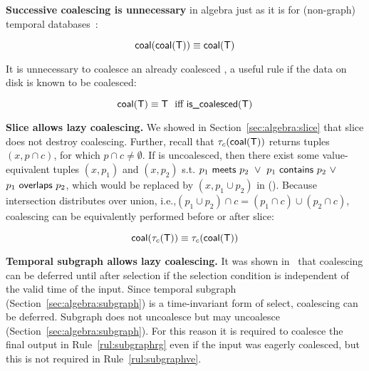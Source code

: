 {\bf Successive coalescing is unnecessary} in \tg algebra just as it
is for (non-graph) temporal
databases~\cite{DBLP:conf/vldb/BohlenSS96}:

\begin{equation}
\textsf{coal}(\textsf{coal}(\mathsf{T})) \equiv \textsf{coal}(\mathsf{T})
\label{rul:twice}
\end{equation}

It is unnecessary to coalesce an already coalesced \ttt, a useful rule
if the data on disk is known to be coalesced:

\begin{equation}
\textsf{coal}(\mathsf{T}) \equiv \mathsf{T} ~~\text{iff}~\textsf{is\_coalesced}(\mathsf{T})
\label{rul:cond}
\end{equation}



{\bf Slice allows lazy coalescing.}  We showed in
Section~\ref{sec:algebra:slice} that slice does not destroy
coalescing.  Further, recall that $\tau_c(\textsf{coal}(\mathsf{T}))$ returns tuples
$(x,p \cap c)$, for which $p \cap c \neq \emptyset$.  If \ttt is
uncoalesced, then there exist some value-equivalent tuples $(x, p_1)$
and $(x, p_2)$
s.t. $p_1~\mathsf{meets}~p_2~\lor~p_1~\mathsf{contains}~p_2~\lor$\\$p_1~\mathsf{overlaps}~p_2$,
which would be replaced by $(x, p_1 \cup p_2)$ in \cl(\ttt).  Because
intersection distributes over union, i.e.,$(p_1 \cup p_2) \cap c =
(p_1 \cap c) \cup (p_2 \cap c)$, coalescing can be equivalently
performed before or after slice: 

\begin{equation}
\textsf{coal}(\tau_c(\mathsf{T})) \equiv \tau_c(\textsf{coal}(\mathsf{T}))
\label{rul:slice}
\end{equation}

{\bf Temporal subgraph allows lazy coalescing.} It was shown
in~\cite{DBLP:conf/vldb/BohlenSS96} that coalescing can be deferred
until after selection if the selection condition is independent of the
valid time of the input. Since temporal subgraph
(Section~\ref{sec:algebra:subgraph}) is a time-invariant form of
select, coalescing can be deferred.  Subgraph does not uncoalesce \tve
but may uncoalesce \trg (Section~\ref{sec:algebra:subgraph}). For this
reason it is required to coalesce the final output in
Rule~\ref{rul:subgraphrg} even if the input was eagerly coalesced, but
this is not required in Rule~\ref{rul:subgraphve}.

